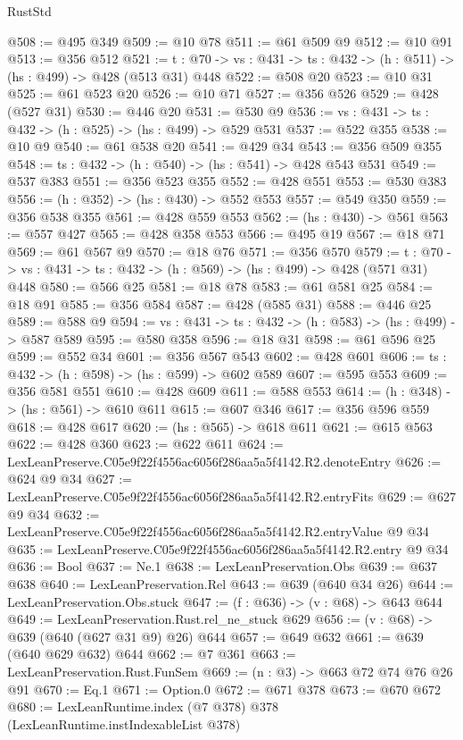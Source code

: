 \begin{lexlean}{RustStd}
\begin{coremodule}
@508 := @495 @349
@509 := @10 @78
@511 := @61 @509 @9
@512 := @10 @91
@513 := @356 @512
@521 := {t : @70} -> {vs : @431} -> {ts : @432} -> (h : @511) -> (hs : @499) -> @428 (@513 @31) @448
@522 := @508 @20
@523 := @10 @31
@525 := @61 @523 @20
@526 := @10 @71
@527 := @356 @526
@529 := @428 (@527 @31)
@530 := @446 @20
@531 := @530 @9
@536 := {vs : @431} -> {ts : @432} -> (h : @525) -> (hs : @499) -> @529 @531
@537 := @522 @355
@538 := @10 @9
@540 := @61 @538 @20
@541 := @429 @34
@543 := @356 @509 @355
@548 := {ts : @432} -> (h : @540) -> (hs : @541) -> @428 @543 @531
@549 := @537 @383
@551 := @356 @523 @355
@552 := @428 @551
@553 := @530 @383
@556 := (h : @352) -> (hs : @430) -> @552 @553
@557 := @549 @350
@559 := @356 @538 @355
@561 := @428 @559 @553
@562 := (hs : @430) -> @561
@563 := @557 @427
@565 := @428 @358 @553
@566 := @495 @19
@567 := @18 @71
@569 := @61 @567 @9
@570 := @18 @76
@571 := @356 @570
@579 := {t : @70} -> {vs : @431} -> {ts : @432} -> (h : @569) -> (hs : @499) -> @428 (@571 @31) @448
@580 := @566 @25
@581 := @18 @78
@583 := @61 @581 @25
@584 := @18 @91
@585 := @356 @584
@587 := @428 (@585 @31)
@588 := @446 @25
@589 := @588 @9
@594 := {vs : @431} -> {ts : @432} -> (h : @583) -> (hs : @499) -> @587 @589
@595 := @580 @358
@596 := @18 @31
@598 := @61 @596 @25
@599 := @552 @34
@601 := @356 @567 @543
@602 := @428 @601
@606 := {ts : @432} -> (h : @598) -> (hs : @599) -> @602 @589
@607 := @595 @553
@609 := @356 @581 @551
@610 := @428 @609
@611 := @588 @553
@614 := (h : @348) -> (hs : @561) -> @610 @611
@615 := @607 @346
@617 := @356 @596 @559
@618 := @428 @617
@620 := (hs : @565) -> @618 @611
@621 := @615 @563
@622 := @428 @360
@623 := @622 @611
@624 := LexLeanPreserve.C05e9f22f4556ac6056f286aa5a5f4142.R2.denoteEntry
@626 := @624 @9 @34
@627 := LexLeanPreserve.C05e9f22f4556ac6056f286aa5a5f4142.R2.entryFits
@629 := @627 @9 @34
@632 := LexLeanPreserve.C05e9f22f4556ac6056f286aa5a5f4142.R2.entryValue @9 @34
@635 := LexLeanPreserve.C05e9f22f4556ac6056f286aa5a5f4142.R2.entry @9 @34
@636 := Bool
@637 := Ne.{1}
@638 := LexLeanPreservation.Obs
@639 := @637 @638
@640 := LexLeanPreservation.Rel
@643 := @639 (@640 @34 @26)
@644 := LexLeanPreservation.Obs.stuck
@647 := (f : @636) -> (v : @68) -> @643 @644
@649 := LexLeanPreservation.Rust.rel_ne_stuck @629
@656 := (v : @68) -> @639 (@640 (@627 @31 @9) @26) @644
@657 := @649 @632
@661 := @639 (@640 @629 @632) @644
@662 := @7 @361
@663 := LexLeanPreservation.Rust.FunSem
@669 := (n : @3) -> @663 @72 @74 @76 @26 @91
@670 := Eq.{1}
@671 := Option.{0}
@672 := @671 @378
@673 := @670 @672
@680 := LexLeanRuntime.index (@7 @378) @378 (LexLeanRuntime.instIndexableList @378)

\end{coremodule}
\end{lexlean}
